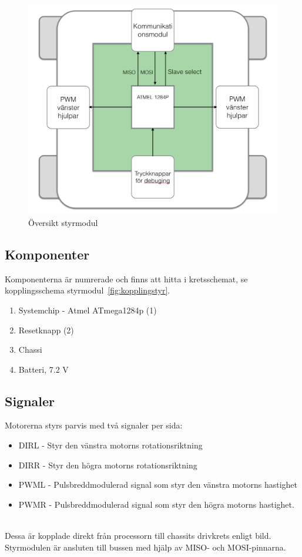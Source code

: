 \documentclass[a4paper,12pt,fleqn]{article}
\begin{document}
\begin{figure}[htp] %
  \begin{center}
  \includegraphics[keepaspectratio=true,width=\linewidth]{bilder/styrmodul}  %
  \end{center}
  \caption{Översikt styrmodul} %
  \label{fig:styr} %
\end{figure}
\newpage


\subsection{Komponenter}
Komponenterna är numrerade och finns att hitta i kretsschemat, se kopplingsschema styrmodul~\ref{fig:kopplingstyr}.
\begin{enumerate}
	\item Systemchip - Atmel ATmega1284p (1)
	\item Resetknapp (2)
	\item Chassi
	\item Batteri, 7.2 V
\end{enumerate}
\subsection{Signaler}
Motorerna styrs parvis med två signaler per sida:
\begin{itemize}
	\item DIRL - Styr den vänstra motorns rotationsriktning
	\item DIRR - Styr den högra motorns rotationsriktning
	\item PWML - Pulsbreddmodulerad signal som styr den vänstra motorns hastighet
	\item PWMR - Pulsbreddmodulerad signal som styr den högra motorns hastighet.
\end{itemize}
~\\
Dessa är kopplade direkt från processorn till chassits drivkrets enligt bild.
Styrmodulen är ansluten till bussen med hjälp av MISO- och MOSI-pinnarna.
\end{document}
